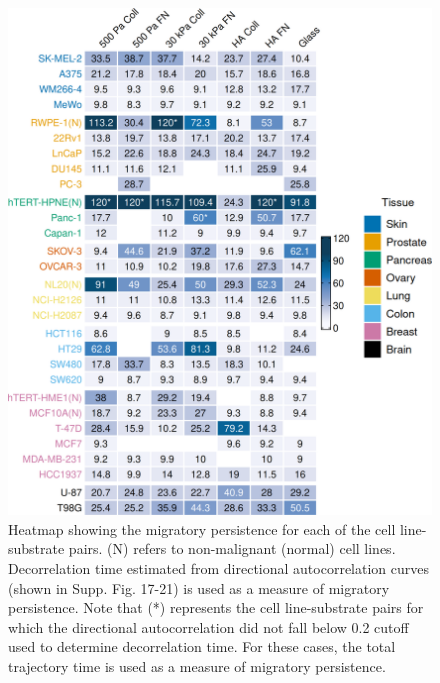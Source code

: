 \documentclass[11pt,letterpaper,english,oneside]{article} %
\begin{document}
\begin{figure}[H]
    \centering
    \includegraphics{../Figures/Supplementary_Figure16/supplementary_figure16.png}
    \caption{Heatmap showing the migratory persistence for each of the cell line-substrate pairs. 
    (N) refers to non-malignant (normal) cell lines. 
    Decorrelation time estimated from directional autocorrelation curves (shown in Supp. Fig. 17-21) is used as a measure of migratory persistence.
    Note that (*) represents the cell line-substrate pairs for which the directional autocorrelation did not fall below 0.2 cutoff used to determine 
    decorrelation time. For these cases, the total trajectory time is used as a measure of migratory persistence.} 
    \label{fig:fig16}
\end{figure}
\end{document}
